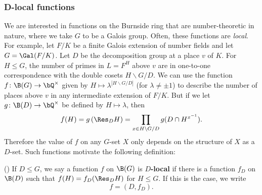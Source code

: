 



\subsubsection{D-local functions}\label{D-loc}

We are interested in functions on the Burnside ring that are number-theoretic in nature, where we take $G$ to be a Galois group. Often, these functions are \textit{local}. For example, let $F / K$ be a finite Galois extension of number fields and let $G = \Gal(F / K)$. Let $D$ be the decomposition group at a place $v$ of $K$. For $H \leq G$, the number of primes in $L = F^{H}$ above $v$ are in one-to-one correspondence with the double cosets $H \backslash G / D$. We can use the function $f \colon \B(G) \to \bQ^{\times}$ given by $H \mapsto  \lambda^{| H \backslash G / D|}$ (for $\lambda \not= \pm 1$) to describe the number of places above $v$ in any intermediate extension of $F / K$. But if we let $g \colon \B(D) \to \bQ^{\times}$ be defined by $H \mapsto \lambda$, then 
        \[ f(H) = g\left(\Res_D H\right) = \prod_{x \in H \backslash G / D} g(D \cap H^{x^{-1}}) .\]
Therefore the value of $f$ on any $G$-set $X$ only depends on the structure of $X$ as a $D$-set.
Such functions motivate the following definition:

\begin{defn}(\cite[Definition 2.33]{reg-const})\label{D-loc-fn}
    If $D \leq G$, we say a function $f$ on $\B(G)$ is \textbf{$D$-local} if there is a function $f_D$ on $\B(D)$ such that $f(H) = f_D(\Res_D H)$ for $H \leq G$.
    If this is the case, we write
    \[ f = (D, f_D). \]
\end{defn}

